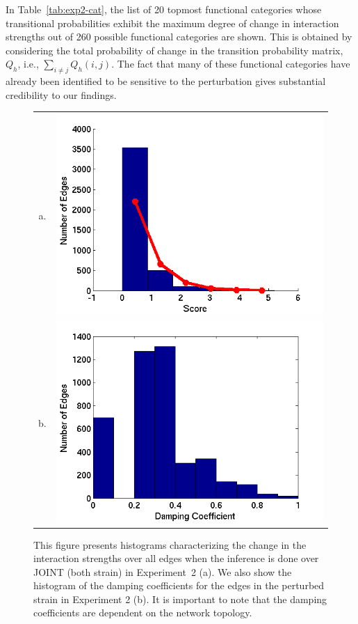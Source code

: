 \documentclass{bioinfo}
\begin{document}
In Table~\ref{tab:exp2-cat}, the list of 20 topmost functional
categories whose transitional probabilities exhibit the maximum degree
of change in interaction strengths out of 260 possible functional
categories are shown. This is obtained by considering the total
probability of change in the transition probability matrix, $Q_{h}$,
i.e., $\sum_{i\ne j} Q_{h}(i, j)$. The fact that many of these
functional categories have already been identified
\citep{Cipollina2008} to be sensitive to the perturbation gives
substantial credibility to our findings.


\begin{figure}[htp]
  \centering
  \begin{tabular}{cc}
a. &\includegraphics[scale=0.5]{results/change_hist} \\
b. &\includegraphics[scale=0.5]{results/strain_hist}  
  \end{tabular}
  \caption{This figure presents  histograms characterizing the change
    in the interaction strengths over all edges when the inference is
    done over JOINT (both strain) in Experiment~2 (a). We also show
    the histogram of the damping coefficients for the edges in the
    perturbed strain in Experiment 2 (b). It is important to note that the damping
    coefficients are dependent on the network topology.}
  \label{fig:hist-score}
\end{figure}
\end{document}
